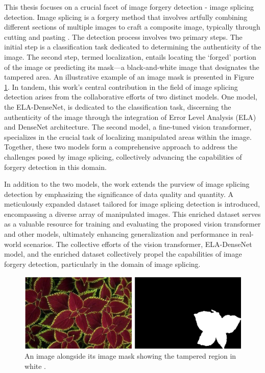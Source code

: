 This thesis focuses on a crucial facet of image forgery detection - image splicing detection. Image splicing is a forgery method that involves artfully combining different sections of multiple images to craft a composite image, typically through cutting and pasting \cite{Basavaraj2022}. The detection process involves two primary steps. The initial step is a classification task dedicated to determining the authenticity of the image. The second step, termed localization, entails locating the `forged' portion of the image or predicting its mask—a black-and-white image that designates the tampered area. An illustrative example of an image mask is presented in Figure \ref{fig:imgMask}. In tandem, this work's central contribution in the field of image splicing detection arises from the collaborative efforts of two distinct models. One model, the ELA-DenseNet, is dedicated to the classification task, discerning the authenticity of the image through the integration of Error Level Analysis (ELA) and DenseNet architecture. The second model, a fine-tuned vision transformer, specializes in the crucial task of localizing manipulated areas within the image. Together, these two models form a comprehensive approach to address the challenges posed by image splicing, collectively advancing the capabilities of forgery detection in this domain.

In addition to the two models, the work extends the purview of image splicing detection by emphasizing the significance of data quality and quantity. A meticulously expanded dataset tailored for image splicing detection is introduced, encompassing a diverse array of manipulated images. This enriched dataset serves as a valuable resource for training and evaluating the proposed vision transformer and other models, ultimately enhancing generalization and performance in real-world scenarios. The collective efforts of the vision transformer, ELA-DenseNet model, and the enriched dataset collectively propel the capabilities of image forgery detection, particularly in the domain of image splicing.



\begin{figure}[!h]
  \centering
  \includegraphics[width=0.8\linewidth]{figures/ImageMask.png} %
  \caption{An image alongside its image mask showing the tampered region in white \cite{pandey2022detecting}.}
  \label{fig:imgMask}
\end{figure}


